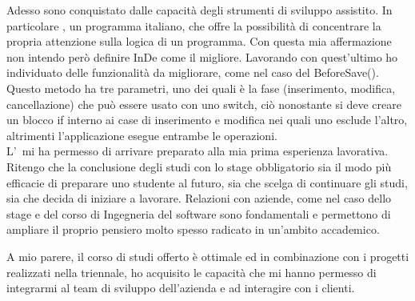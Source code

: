 Adesso sono conquistato dalle capacità degli strumenti di sviluppo assistito. In particolare \inde, un programma italiano, che offre la possibilità di concentrare la propria attenzione sulla logica di un programma.  
Con questa mia affermazione non intendo però definire InDe come il migliore. Lavorando con quest'ultimo ho individuato delle funzionalità da migliorare, come nel caso del BeforeSave(). Questo metodo ha tre parametri, uno dei quali è la fase (inserimento, modifica, cancellazione) che può essere usato con uno switch, ciò nonostante si deve creare un blocco if interno ai case di inserimento e modifica nei quali uno esclude l'altro, altrimenti l'applicazione esegue entrambe le operazioni.\\

L'\myUni\ mi ha permesso di arrivare preparato alla mia prima esperienza lavorativa. Ritengo che la conclusione degli studi con lo stage obbligatorio sia il modo più efficacie di preparare uno studente al futuro, sia che scelga di continuare gli studi, sia che decida di iniziare a lavorare. Relazioni con aziende, come nel caso dello stage e del corso di Ingegneria del software sono fondamentali e permettono di ampliare il proprio pensiero molto spesso radicato in un'ambito accademico. 

A mio parere, il corso di studi offerto è ottimale ed in combinazione con i progetti realizzati nella triennale, ho acquisito le capacità che mi hanno permesso di integrarmi al team di sviluppo dell'azienda e ad interagire con i clienti. 
 